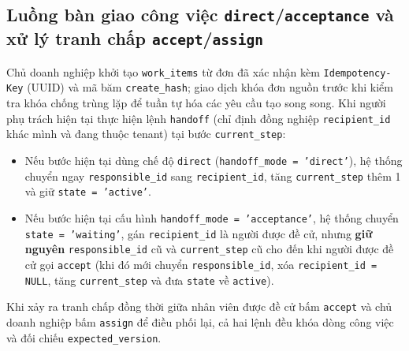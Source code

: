 

\subsection{Luồng bàn giao công việc \texttt{direct}/\texttt{acceptance} và xử lý tranh chấp \texttt{accept}/\texttt{assign}}
Chủ doanh nghiệp khởi tạo \texttt{work\_\hspace{0pt}items} từ đơn đã xác nhận kèm \texttt{Idempotency-\hspace{0pt}Key} (UUID) và mã băm \texttt{create\_\hspace{0pt}hash}; giao dịch khóa đơn nguồn trước khi kiểm tra khóa chống trùng lặp để tuần tự hóa các yêu cầu tạo song song.
Khi người phụ trách hiện tại thực hiện lệnh \texttt{handoff} (chỉ định đồng nghiệp \texttt{recipient\_\hspace{0pt}id} khác mình và đang thuộc tenant) tại bước \texttt{current\_\hspace{0pt}step}:
\begin{itemize}
  \item Nếu bước hiện tại dùng chế độ \texttt{direct} (\texttt{handoff\_\hspace{0pt}mode = 'direct'}), hệ thống chuyển ngay \texttt{responsible\_\hspace{0pt}id} sang \texttt{recipient\_\hspace{0pt}id}, tăng \texttt{current\_\hspace{0pt}step} thêm 1 và giữ \texttt{state = 'active'}.
  \item Nếu bước hiện tại cấu hình \texttt{handoff\_\hspace{0pt}mode = 'acceptance'}, hệ thống chuyển \texttt{state = 'waiting'}, gán \texttt{recipient\_\hspace{0pt}id} là người được đề cử, nhưng \textbf{giữ nguyên} \texttt{responsible\_\hspace{0pt}id} cũ và \texttt{current\_\hspace{0pt}step} cũ cho đến khi người được đề cử gọi \texttt{accept} (khi đó mới chuyển \texttt{responsible\_\hspace{0pt}id}, xóa \texttt{recipient\_\hspace{0pt}id = NULL}, tăng \texttt{current\_\hspace{0pt}step} và đưa \texttt{state} về \texttt{active}).
\end{itemize}
Khi xảy ra tranh chấp đồng thời giữa nhân viên được đề cử bấm \texttt{accept} và chủ doanh nghiệp bấm \texttt{assign} để điều phối lại, cả hai lệnh đều khóa dòng công việc và đối chiếu \texttt{expected\_\hspace{0pt}version}.
